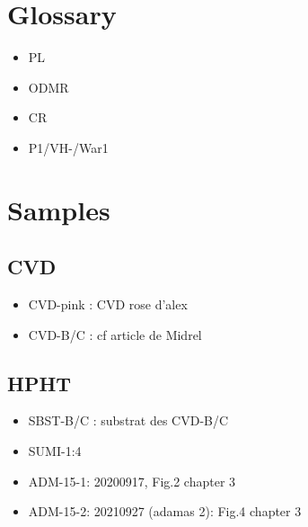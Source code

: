 \documentclass[a4paper]{article}
\begin{document}
\section{Glossary}
\begin{itemize}
\item PL
\item ODMR
\item CR
\item P1/VH-/War1
\end{itemize}
\section{Samples}
\subsection{CVD}
\begin{itemize}
\item CVD-pink : CVD rose d'alex
\item CVD-B/C : cf article de Midrel
\end{itemize}
\subsection{HPHT}
\begin{itemize}
\item SBST-B/C : substrat des CVD-B/C
\item SUMI-1:4
\item ADM-15-1: 20200917, Fig.2 chapter 3
\item ADM-15-2: 20210927 (adamas 2): Fig.4 chapter 3
\end{itemize}
\end{document}
